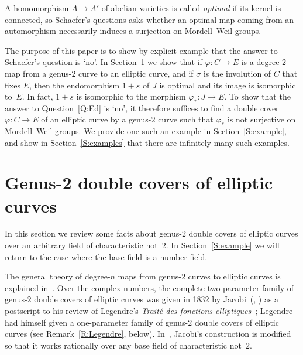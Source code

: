 \documentclass{amsart}
\theoremstyle{remark}
\begin{document}
A homomorphism $A\to A'$ of abelian varieties is called \emph{optimal} if its
kernel is connected, so Schaefer's questions asks whether an optimal map coming
from an automorphism necessarily induces a surjection on Mordell--Weil groups.

The purpose of this paper is to show by explicit example that the answer to 
Schaefer's question is `no'. In Section~\ref{S:double} we show that if 
$\varphi\colon C\to E$ is a degree-$2$ map from a genus-$2$ curve to an 
elliptic curve, and if $\sigma$ is the involution of $C$ that fixes $E$, then
the endomorphism $1+s$ of $J$ is optimal and its image is isomorphic to~$E$.
In fact, $1+s$ is isomorphic to the morphism $\varphi_*\colon J\to E$.  To show
that the answer to Question~\ref{Q:Ed} is `no', it therefore suffices to find a 
double cover $\varphi\colon C\to E$ of an elliptic curve by a genus-$2$ curve
such that $\varphi_*$ is not surjective on Mordell--Weil groups.  We provide 
one such an example in Section~\ref{S:example}, and show in 
Section~\ref{S:examples} that there are infinitely many such examples.

\section{Genus-2 double covers of elliptic curves}
\label{S:double}

In this section we review some facts about genus-$2$ double covers of elliptic
curves over an arbitrary field of characteristic not~$2$.  In 
Section~\ref{S:example} we will return to the case where the base field is a 
number field.
 
The general theory of degree-$n$ maps from genus-$2$ curves to elliptic curves
is explained in~\cite{FreyKani1991}. Over the complex numbers, the complete 
two-parameter family of genus-$2$ double covers of elliptic curves was given
in 1832 by Jacobi~(\cite[pp.~416--417]{Jacobi1832}, 
\cite[Volume~I, pp.~380--382]{Jacobi}) as a postscript to his review of 
Legendre's \emph{Trait\'e des fonctions elliptiques}~\cite{Legendre1828};
Legendre had himself given a one-parameter family of genus-$2$ double covers 
of elliptic curves (see Remark~\ref{R:Legendre}, below).
In~\cite[\S{}3.2]{HoweLeprevostEtAl2000}, Jacobi's construction is modified so
that it works rationally over any base field of characteristic not~$2$.
\end{document}
